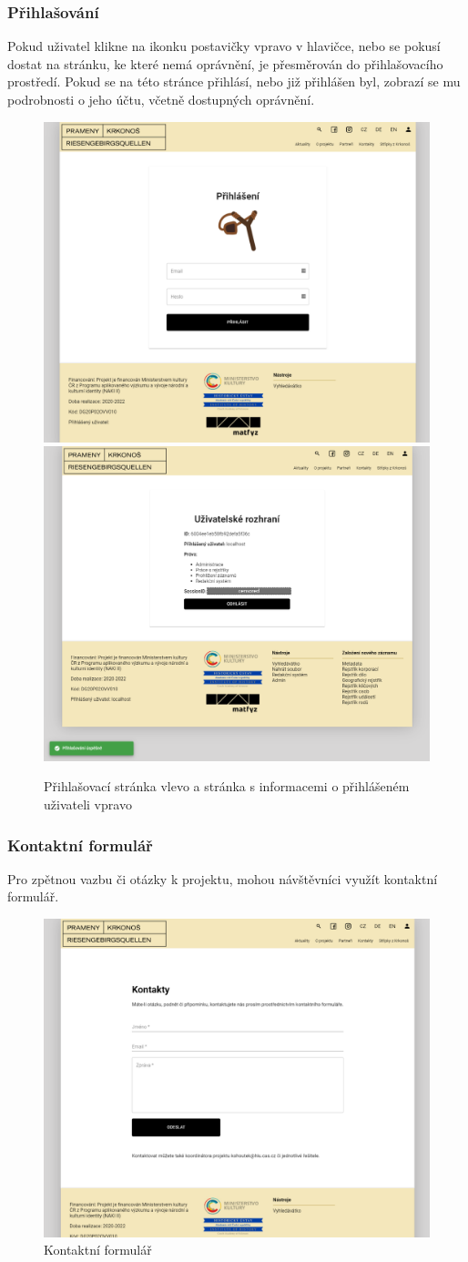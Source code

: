 \subsubsection{Přihlašování}
Pokud uživatel klikne na ikonku postavičky vpravo v hlavičce, nebo se pokusí dostat
na stránku, ke které nemá oprávnění, je přesměrován do přihlašovacího prostředí.
Pokud se na této stránce přihlásí, nebo již přihlášen byl, zobrazí se mu podrobnosti o jeho účtu,
včetně dostupných oprávnění.\\
\begin{figure}[H]
	\centering
	\includegraphics[width=.49\linewidth]{img/loginSceneB.png}
	\includegraphics[width=.5\linewidth]{img/loginSceneA.png}
	\caption{Přihlašovací stránka vlevo a stránka s informacemi o přihlášeném uživateli vpravo}
\end{figure}

\subsubsection{Kontaktní formulář}
Pro zpětnou vazbu či otázky k projektu, mohou návštěvníci využít kontaktní formulář.
\begin{figure}[H]
	\centering
	\includegraphics[width=.8\linewidth]{img/contactScene.png}
	\caption{Kontaktní formulář}
\end{figure}

